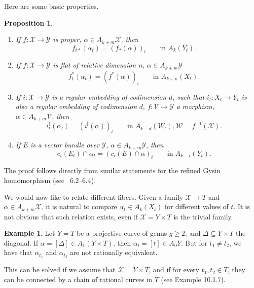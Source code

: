 \documentclass[leqno, openany]{memoir}
\newtheorem{prop}[thm]{Proposition}
\theoremstyle{definition}
\newtheorem{exm}[thm]{Example}
\theoremstyle{remark}
\theoremstyle{plain}
\theoremstyle{definition}
\theoremstyle{remark}
\newcommand{\mc}[1]{\mathcal{#1}}
\begin{document}
Here are some basic properties.  \begin{prop}\label{prop:basicprop}
    \begin{enumerate} \item If $f\colon \mc{X} \to \mc{Y}$ is proper, $\alpha
        \in A_{k+m}\mc{X}$, then \[ f_{t\ast}(\alpha_t)={ (f_\ast(\alpha)) }_t
        \qquad \text{in }A_k(Y_t). \]

\item If $f\colon \mc{X} \to \mc{Y}$ is flat of relative dimension $n$, $\alpha
    \in A_{k+m}\mc{Y}$ \[ f_t^\ast(\alpha_t)={ (f^\ast(\alpha)) }_t \qquad
    \text{in }A_{k+n}(X_t). \]

\item If $i\colon \mc{X} \to \mc{Y}$ is a regular embedding of codimension $d$,
    such that $i_t\colon X_t \to Y_t$ is also a regular embedding of
    codimension $d$, $f\colon \mc{V} \to \mc{Y}$ a morphism, $\alpha \in
    A_{k+m}\mc{V}$, then \[ i_t^!(\alpha_t)={ (i^!(\alpha)) }_t \qquad \text{in
    } A_{k-d}(W_t), \mc{W}=f^{-1}(\mc{X}). \] \end{enumerate} \begin{enumerate}
    \setcounter{enumi}{3} \item If $E$ is a vector bundle over $\mc{Y}$,
    $\alpha \in A_{k+m} \mc{Y}$, then \[ c_i(E_t) \cap \alpha_t = { (c_i(E)
    \cap \alpha) }_t \qquad \text{in }A_{k-i}(Y_t). \] \end{enumerate}
\end{prop}

The proof follows directly from similar statements for the refined Gysin
homomorphism (see \textsection~6.2--6.4).

We would now like to relate different fibers. Given a family $\mc{X} \to T$ and
$\alpha \in A_{k+m}\mc{X}$, it is natural to compare $\alpha_t \in A_k(X_t)$
for different values of $t$. It is not obvious that such relation exists, even
if $\mc{X}=Y \times T$ is the trivial family.

\begin{exm} Let $Y=T$ be a projective curve of genus $g \geq 2$, and
    $\Delta\subseteq Y \times T$ the diagonal. If $\alpha = [\Delta] \in A_1(Y
    \times T)$, then $\alpha_t = [t] \in A_0 Y$. But for $t_1 \neq t_2$, we
    have that $\alpha_{t_1}$ and $\alpha_{t_2}$ are not rationally equivalent.
\end{exm}

This can be solved if we assume that $\mc{X}=Y \times T$, and if for every
$t_1, t_2 \in T$, they can be connected by a chain of rational curves in $T$
(see Example 10.1.7).
\end{document}
